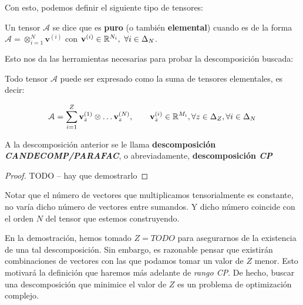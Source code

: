 Con esto, podemos definir el siguiente tipo de tensores:

\begin{definicion}
    Un tensor $\mathcal{A}$ se dice que es \textbf{puro} (o también \textbf{elemental}) cuando es de la forma $\mathcal{A} = \otimes_{i = 1}^N \mathbf{v}^{(i)}$ con $\mathbf{v}^{(i)} \in \mathbb{R}^{N_i},\ \forall i \in \Delta_{N}$.
\end{definicion}

Esto nos da las herramientas necesarias para probar la descomposición buscada:

\begin{proposicion}
    Todo tensor $\mathcal{A}$ puede ser expresado como la suma de tensores elementales, es decir:

    \begin{equation} \label{eq:cp_decomp}
        \mathcal{A} = \sum_{i = 1}^Z \mathbf{v}_z^{(1)} \otimes \ldots \mathbf{v}_z^{(N)},\qquad
        \mathbf{v}_z^{(i)} \in \mathbb{R}^{M_i}, \forall z \in \Delta_{Z}, \forall i \in \Delta_{N}
    \end{equation}

\end{proposicion}

A la descomposición anterior se le llama \textbf{descomposición \textit{CANDECOMP/PARAFAC}}, o abreviadamente, \textbf{descomposición \textit{CP}}

\begin{proof}

TODO -- hay que demostrarlo

\end{proof}

\begin{observacion}
    Notar que el número de vectores que multiplicamos tensorialmente es constante, no varía dicho número de vectores entre sumandos. Y dicho número coincide con el orden $N$ del tensor que estemos construyendo.
\end{observacion}

\begin{observacion}
En la demostración, hemos tomado $Z = TODO$ para asegurarnos de la existencia de una tal descomposición. Sin embargo, es razonable pensar que existirán combinaciones de vectores con las que podamos tomar un valor de $Z$ menor. Esto motivará la definición que haremos más adelante de \textit{rango CP}. De hecho, buscar una descomposición que minimice el valor de $Z$ es un problema de optimización complejo.
\end{observacion}


